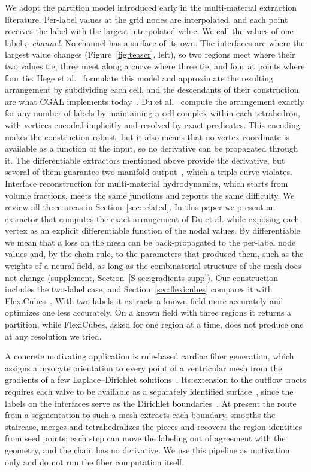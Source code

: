 \documentclass{egpubl}
\newcommand{\sref}[1]{\ref*{S-#1}}
\newcommand{\suppp}[1]{supplement, Section~\sref{#1}}
\theoremstyle{definition}
\begin{document}
We adopt the partition model introduced early in the multi-material
extraction literature. Per-label values at the grid nodes are interpolated, and
each point receives the label with the largest interpolated value. We call the
values of one label a \emph{channel}. No channel has a surface of its own. The interfaces are where the largest value
changes (Figure~\ref{fig:teaser}, left), so two regions meet where their two values tie, three meet along a
curve where three tie, and four at points where four tie. Hege et
al.~\cite{hege1997} formulate this model and approximate the resulting
arrangement by subdividing each cell, and the descendants of their
construction are what CGAL implements today~\cite{cgalmesh3}. Du et
al.~\cite{du2022} compute the arrangement exactly for any number of labels by
maintaining a cell complex within each tetrahedron, with vertices encoded
implicitly and resolved by exact predicates. This encoding makes the
construction robust, but it also means that no vertex coordinate is
available as a function of the input, so no derivative can be propagated
through it. The differentiable extractors mentioned above provide
the derivative, but several of them guarantee two-manifold
output~\cite{shen2023, tetweave2025}, which a triple curve violates. Interface
reconstruction for multi-material hydrodynamics, which starts from volume
fractions, meets the same junctions and reports the same difficulty. We review all three
areas in Section~\ref{sec:related}. In this paper we present an extractor that computes the exact arrangement of Du et al.
while exposing each vertex as an explicit differentiable function of the nodal
values. By differentiable we mean that a loss on the mesh can be
back-propagated to the per-label node values and, by the chain rule, to
the parameters that produced them, such as the weights of a neural field, as long as the
combinatorial structure of the mesh does not change
(\suppp{sec:gradients-supp}). Our construction includes the two-label case, and
Section~\ref{sec:flexicubes} compares it with FlexiCubes~\cite{shen2023}.
With two labels it extracts a known field more accurately and optimizes one
less accurately. On a known field with three regions it returns a
partition, while FlexiCubes, asked for one region at a time, does not produce
one at any resolution we tried.

A concrete motivating application is rule-based cardiac fiber generation,
which assigns a myocyte orientation to every point of a ventricular mesh from
the gradients of a few Laplace--Dirichlet solutions~\cite{bayer2012}. Its
extension to the outflow tracts requires each valve to be available as a
separately identified surface~\cite{doste2019}, since the labels on the
interfaces serve as the Dirichlet boundaries~\cite{svmultiphysics}. At
present the route from a segmentation to such a mesh extracts each boundary,
smooths the staircase, merges and tetrahedralizes the pieces and recovers the
region identities from seed points; each step can move the labeling out of
agreement with the geometry, and the chain has no derivative. We use this pipeline as
motivation only and do not run the fiber computation itself.
\end{document}
